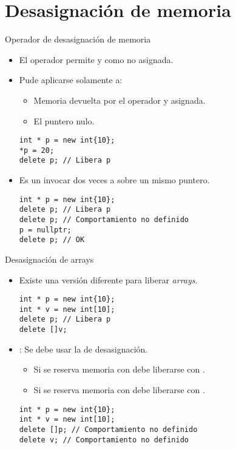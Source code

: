 \section{Desasignación de memoria}

\begin{frame}[t,fragile]{Operador de desasignación de memoria}
\begin{itemize}
  \item El operador  permite  
        y  como no asignada.
  \item Pude aplicarse solamente a:
    \begin{itemize}
      \item Memoria devuelta por el operador  y asignada.
      \item El puntero nulo.
    \end{itemize}
\begin{lstlisting}
int * p = new int{10};
*p = 20;
delete p; // Libera p
\end{lstlisting}

  \item Es un  invocar dos veces a  sobre un mismo puntero.
\begin{lstlisting}
int * p = new int{10};
delete p; // Libera p
delete p; // Comportamiento no definido
p = nullptr;
delete p; // OK
\end{lstlisting}
\end{itemize}
\end{frame}

\begin{frame}[t,fragile]{Desasignación de arrays}
\begin{itemize}
  \item Existe una versión diferente para liberar \emph{arrays}.
\begin{lstlisting}
int * p = new int{10};
int * v = new int[10];
delete p; // Libera p
delete []v;
\end{lstlisting}

  \item {}: Se debe usar la  de desasignación.
    \begin{itemize}
      \item Si se reserva memoria con  debe liberarse con .
      \item Si se reserva memoria con  debe liberarse con .
    \end{itemize}
\begin{lstlisting}
int * p = new int{10};
int * v = new int[10];
delete []p; // Comportamiento no definido
delete v; // Comportamiento no definido
\end{lstlisting}
\end{itemize}
\end{frame}

